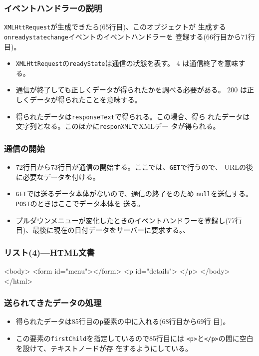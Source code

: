 \documentclass[dvipsk]{beamer}
\begin{document}
\begin{frame}[containsverbatim]
\frametitle{イベントハンドラーの説明}
\texttt{XMLHttRequest}が生成できたら(65行目)、このオブジェクトが
       生成する\texttt{onreadystatechange}イベントのイベントハンドラーを
       登録する(66行目から71行目)。
 \begin{itemize}
  \item \texttt{XMLHttRequest}の\texttt{readyState}は通信の状態を表す。
	$4$ は通信終了を意味する。
  \item 通信が終了しても正しくデータが得られたかを調べる必要がある。
	$200$ は正しくデータが得られたことを意味する。
  \item 得られたデータは\texttt{responseText}で得られる。この場合、得ら
	れたデータは文字列となる。このほかに\texttt{responXML}でXMLデー
	タが得られる。
 \end{itemize}
\frametitle{通信の開始}
\begin{itemize}
 \item 72行目から73行目が通信の開始する。ここでは、\texttt{GET}で行うので、
       URLの後に必要なデータを付ける。
 \item \texttt{GET}では送るデータ本体がないので、通信の終了をのため
       \texttt{null}を送信する。\texttt{POST}のときはここでデータ本体を
       送る。
 \item プルダウンメニューが変化したときのイベントハンドラーを登録し(77行
       目)、最後に現在の日付データをサーバーに要求する。、
\end{itemize}
\end{frame}
\begin{frame}[containsverbatim]
\frametitle{リスト(4)---HTML文書}
\begin{listingcont}
<body>
  <form id="menu"></form>
  <p id="details"> </p>
</body>
</html>
\end{listingcont}
\end{frame}
\begin{frame}[containsverbatim]
\frametitle{送られてきたデータの処理}
\begin{itemize}
 \item 得られたデータは85行目の\texttt{p}要素の中に入れる(68行目から69行
       目)。
 \item この要素の\texttt{firstChild}を指定しているので85行目には
       \texttt{<p>}と\texttt{</p>}の間に空白を設けて、テキストノードが存
       在するようにしている。
\end{itemize}\end{frame}
\end{document}
